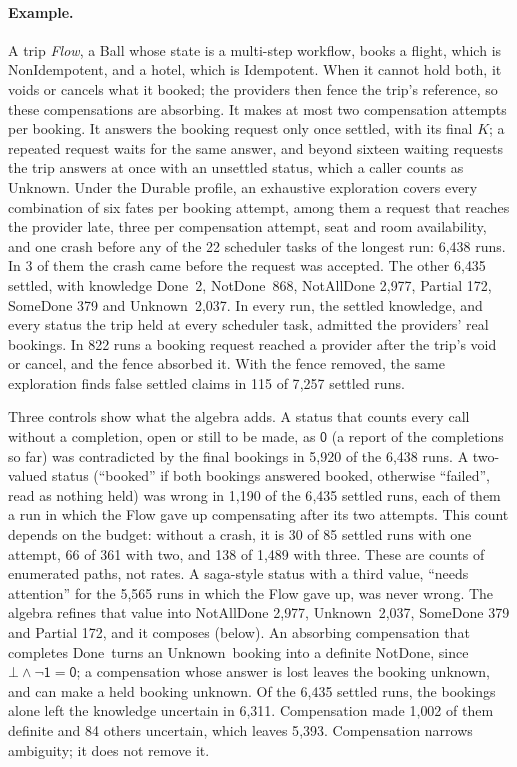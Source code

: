 \documentclass[11pt]{article}
\theoremstyle{definition}
\theoremstyle{plain}
\newcommand{\Done}{\textsf{Done}}
\newcommand{\NotDone}{\textsf{NotDone}}
\newcommand{\Unknown}{\textsf{Unknown}}
\newcommand{\Idem}{\textsf{Idempotent}}
\newcommand{\NonIdem}{\textsf{NonIdempotent}}
\newcommand{\yes}{\mathsf{1}}
\newcommand{\no}{\mathsf{0}}
\newcommand{\mayb}{\bot}
\begin{document}
\paragraph{Example.} A trip \emph{Flow}, a Ball whose state is a multi-step workflow, books a flight, which is \NonIdem, and a hotel, which is \Idem. When it cannot hold both, it voids or cancels what it booked; the providers then fence the trip's reference, so these compensations are absorbing. It makes at most two compensation attempts per booking. It answers the booking request only once settled, with its final $K$; a repeated request waits for the same answer, and beyond sixteen waiting requests the trip answers at once with an unsettled status, which a caller counts as \Unknown. Under the Durable profile, an exhaustive exploration covers every combination of six fates per booking attempt, among them a request that reaches the provider late, three per compensation attempt, seat and room availability, and one crash before any of the 22 scheduler tasks of the longest run: 6{,}438 runs. In 3 of them the crash came before the request was accepted. The other 6{,}435 settled, with knowledge \Done\ 2, \NotDone\ 868, \textsf{NotAllDone} 2{,}977, \textsf{Partial} 172, \textsf{SomeDone} 379 and \Unknown\ 2{,}037. In every run, the settled knowledge, and every status the trip held at every scheduler task, admitted the providers' real bookings. In 822 runs a booking request reached a provider after the trip's void or cancel, and the fence absorbed it. With the fence removed, the same exploration finds false settled claims in 115 of 7{,}257 settled runs.

Three controls show what the algebra adds. A status that counts every call without a completion, open or still to be made, as $\no$ (a report of the completions so far) was contradicted by the final bookings in 5{,}920 of the 6{,}438 runs. A two-valued status (``booked'' if both bookings answered booked, otherwise ``failed'', read as nothing held) was wrong in 1{,}190 of the 6{,}435 settled runs, each of them a run in which the Flow gave up compensating after its two attempts. This count depends on the budget: without a crash, it is 30 of 85 settled runs with one attempt, 66 of 361 with two, and 138 of 1{,}489 with three. These are counts of enumerated paths, not rates. A saga-style status with a third value, ``needs attention'' for the 5{,}565 runs in which the Flow gave up, was never wrong. The algebra refines that value into \textsf{NotAllDone} 2{,}977, \Unknown\ 2{,}037, \textsf{SomeDone} 379 and \textsf{Partial} 172, and it composes (below). An absorbing compensation that completes \Done\ turns an \Unknown\ booking into a definite \NotDone, since $\mayb \wedge \neg\yes = \no$; a compensation whose answer is lost leaves the booking unknown, and can make a held booking unknown. Of the 6{,}435 settled runs, the bookings alone left the knowledge uncertain in 6{,}311. Compensation made 1{,}002 of them definite and 84 others uncertain, which leaves 5{,}393. Compensation narrows ambiguity; it does not remove it.
\end{document}
